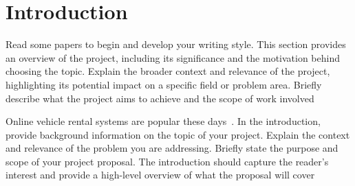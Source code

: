 \newpage
\section{Introduction}
Read some papers to begin and develop your writing style.
This section provides an overview of the project, including its significance and the motivation behind choosing the topic. Explain the broader context and relevance of the project, highlighting its potential impact on a specific field or problem area. Briefly describe what the project aims to achieve and the scope of work involved

Online vehicle rental systems are popular these days~\cite{vehicle}.
In the introduction, provide background information on the topic of your project. Explain the context and relevance of the problem you are addressing. Briefly state the purpose and scope of your project proposal. The introduction should capture the reader's interest and provide a high-level overview of what the proposal will cover~\cite{ref1}
